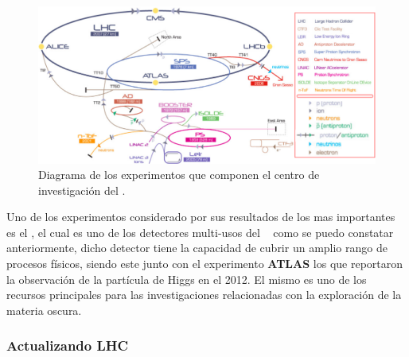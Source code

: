 \begin{figure}[h!]
\centering
\includegraphics[width=.9\textwidth]{Analisis_y_Resultados/imagenes/cern.png}
\caption[Diagrama de los experimentos que componen el centro de investigación del \CERN.]{Diagrama de los experimentos que componen el centro de investigación del \CERN.\footnotemark}
    \label{cern}
\end{figure}

Uno de los experimentos considerado por sus resultados de los mas importantes es el \CMS, el cual es uno de los detectores multi-usos del \CERN ~ como se puedo constatar anteriormente, dicho detector tiene la capacidad de cubrir un amplio rango de procesos físicos, siendo este junto con el experimento \textbf{ATLAS} los que reportaron la observación de la partícula de Higgs en el 2012. El mismo es uno de los recursos principales para las investigaciones relacionadas con la exploración de la materia oscura.

\subsubsection{Actualizando LHC}

